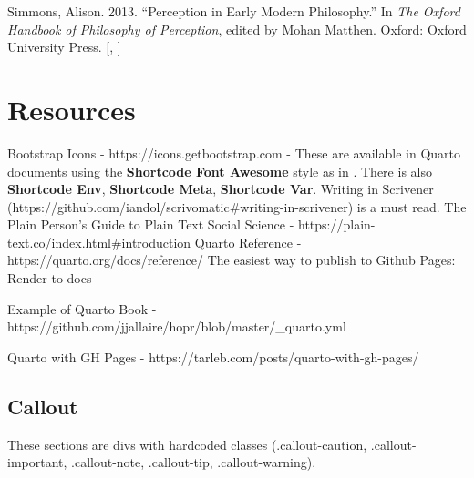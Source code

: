 \documentclass[
  12pt,
  a4paper,
  oneside,
  titlepage,
  toclink=all,
  toc=bibliography]{scrbook}
\newlength{\cslhangindent}
\newlength{\cslentryspacingunit} %
\newenvironment{CSLReferences}[2] %
 {%
  \setlength{\parindent}{0pt}
  \ifodd #1
  \let\oldpar\par
  \def\par{\hangindent=\cslhangindent\oldpar}
  \fi
  \setlength{\parskip}{#2\cslentryspacingunit}
 }%
 {}
\theoremstyle{definition}
\theoremstyle{plain}
\theoremstyle{plain}
\theoremstyle{plain}
\theoremstyle{plain}
\theoremstyle{definition}
\theoremstyle{definition}
\theoremstyle{plain}
\theoremstyle{remark}
\begin{document}
\begin{CSLReferences}{1}{0}
\leavevmode{}%
Simmons, Alison. 2013. {``Perception in Early Modern Philosophy.''} In
\emph{The Oxford Handbook of Philosophy of Perception}, edited by Mohan
Matthen. Oxford: Oxford University Press.
{[},
\protect\hyperlink{cite_114}{\pageref{cite_114}}{]}

\end{CSLReferences}

\hypertarget{sec-scriv130}{%
\chapter{Resources}\label{sec-scriv130}}

\protect\hypertarget{scriv130}{}{}

Bootstrap Icons - https://icons.getbootstrap.com - These are available
in Quarto documents using the \textbf{Shortcode Font Awesome} style as
in \texttt{} . There is also \textbf{Shortcode Env}, \textbf{Shortcode
Meta}, \textbf{Shortcode Var}. Writing in Scrivener
(https://github.com/iandol/scrivomatic\#writing-in-scrivener) is a must
read. The Plain Person's Guide to Plain Text Social Science -
https://plain-text.co/index.html\#introduction Quarto Reference -
https://quarto.org/docs/reference/ The easiest way to publish to Github
Pages: Render to docs

Example of Quarto Book -
https://github.com/jjallaire/hopr/blob/master/\_quarto.yml

Quarto with GH Pages - https://tarleb.com/posts/quarto-with-gh-pages/

\hypertarget{sec-scriv131}{%
\section{Callout}\label{sec-scriv131}}

\protect\hypertarget{scriv131}{}{}

These sections are divs with hardcoded classes (.callout-caution,
.callout-important, .callout-note, .callout-tip, .callout-warning).

\begin{tcolorbox}[enhanced jigsaw, left=2mm, colframe=quarto-callout-caution-color-frame, bottomtitle=1mm, colback=white, coltitle=black, title=\textcolor{quarto-callout-caution-color}{\faFire}\hspace{0.5em}{Caution}, toprule=.15mm, rightrule=.15mm, opacityback=0, breakable, toptitle=1mm, titlerule=0mm, colbacktitle=quarto-callout-caution-color!10!white, arc=.35mm, bottomrule=.15mm, leftrule=.75mm, opacitybacktitle=0.6]

\end{tcolorbox}
\end{document}
